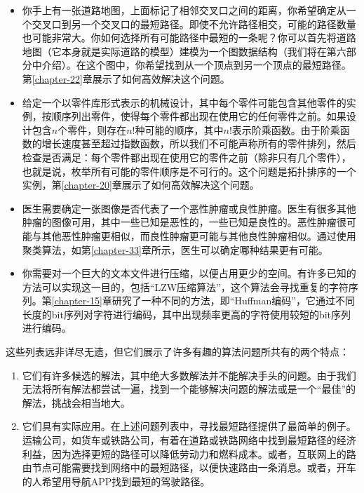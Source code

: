 \documentclass[lang=cn,newtx,10pt,scheme=chinese]{elegantbook}
\begin{document}
\begin{itemize}
    \item 你手上有一张道路地图，上面标记了相邻交叉口之间的距离，你希望确定从一个交叉口到另一个交叉口的最短路径。即使不允许路径相交，可能的路径数量也可能非常大。你如何选择所有可能路径中最短的一条呢？你可以首先将道路地图（它本身就是实际道路的模型）建模为一个图数据结构（我们将在第六部分中介绍）。在这个图中，你希望找到从一个顶点到另一个顶点的最短路径。第\ref{chapter-22}章展示了如何高效解决这个问题。
    \item 给定一个以零件库形式表示的机械设计，其中每个零件可能包含其他零件的实例，按顺序列出零件，使得每个零件都出现在使用它的任何零件之前。如果设计包含$n$个零件，则存在$n!$种可能的顺序，其中$n!$表示阶乘函数。由于阶乘函数的增长速度甚至超过指数函数，所以我们不可能声称所有的零件排列，然后检查是否满足：每个零件都出现在使用它的零件之前（除非只有几个零件），也就是说，枚举所有可能的零件顺序是不可行的。这个问题是拓扑排序的一个实例，第\ref{chapter-20}章展示了如何高效解决这个问题。
    \item 医生需要确定一张图像是否代表了一个恶性肿瘤或良性肿瘤。医生有很多其他肿瘤的图像可用，其中一些已知是恶性的，一些已知是良性的。恶性肿瘤很可能与其他恶性肿瘤更相似，而良性肿瘤更可能与其他良性肿瘤相似。通过使用聚类算法，如第\ref{chapter-33}章所示，医生可以确定哪种结果更有可能。
    \item 你需要对一个巨大的文本文件进行压缩，以便占用更少的空间。有许多已知的方法可以实现这一目的，包括``LZW压缩算法''，这个算法会寻找重复的字符序列。第\ref{chapter-15}章研究了一种不同的方法，即``Huffman编码''，它通过不同长度的bit序列对字符进行编码，其中出现频率更高的字符使用较短的bit序列进行编码。
\end{itemize}

这些列表远非详尽无遗，但它们展示了许多有趣的算法问题所共有的两个特点：

\begin{enumerate}
    \item 它们有许多候选的解法，其中绝大多数解法并不能解决手头的问题。由于我们无法将所有解法都尝试一遍，找到一个能够解决问题的解法或是一个``最佳''的解法，挑战会相当地大。
    \item 它们具有实际应用。在上述问题列表中，寻找最短路径提供了最简单的例子。运输公司，如货车或铁路公司，有着在道路或铁路网络中找到最短路径的经济利益，因为选择更短的路径可以降低劳动力和燃料成本。或者，互联网上的路由节点可能需要找到网络中的最短路径，以便快速路由一条消息。或者，开车的人希望用导航APP找到最短的驾驶路径。
\end{enumerate}
\end{document}
